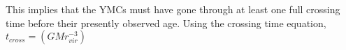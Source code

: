 This implies that the YMCs must have gone through at least one full crossing time before their presently observed age. Using the crossing time equation, $t_{cross}=(GMr_{vir}^{-3})$